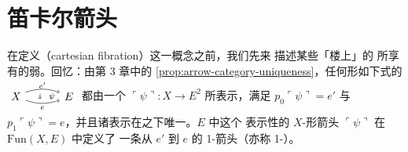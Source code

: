 \providecommand{\qcOne}{\mathbf{1}}   %
\providecommand{\qcTwo}{\mathbf{2}}   %
\providecommand{\qcThree}{\mathbf{3}} %
\providecommand{\qcFour}{\mathbf{4}}  %
\providecommand{\qcor}[1]{\ulcorner#1\urcorner}   %
\providecommand{\cellpair}[5]{$\vcenter{\hbox{\begin{tikzpicture}[x=1.15em,y=1.15em]%
\node (s) at (0,0) {$#1$};%
\node (t) at (4.2,0) {$#2$};%
\draw[->] (0.75,0.32) to[bend left=18] (3.45,0.32);%
\node at (2.1,0.88) {$\scriptstyle#3$};%
\draw[->] (0.75,-0.32) to[bend right=18] (3.45,-0.32);%
\node at (2.1,-0.93) {$\scriptstyle#4$};%
\draw[->] (1.95,0.2) to[bend right=32] (1.95,-0.2);%
\node at (2.85,0) {$\scriptstyle#5$};%
\end{tikzpicture}}}$\ignorespaces}

\section{笛卡尔箭头}\label{sec:cartesian-arrows}

在定义\textbf{\trCartesianFibration}（cartesian fibration）这一概念之前，我们先来
描述某些「楼上」的%
\trNaturalTransformation{}所享有的弱\trUniversalProperty。回忆：由第 3 章中的%
\cref{prop:arrow-category-uniqueness}，任何形如下式的\trNaturalTransformation{}
\cellpair{X}{E}{e'}{e}{\psi}
都由一个\trFunctor{} $\qcor{\psi}\colon X\to E^{2}$ 所表示，满足 $p_{0}\qcor{\psi}=e'$
与 $p_{1}\qcor{\psi}=e$，并且诸表示在\trFiberedIsomorphism{}之下唯一。$E$ 中这个%
表示性的 $X$-形箭头 $\qcor{\psi}$ 在\trFunctorSpace{} $\mathrm{Fun}(X,E)$ 中定义了%
一条从 $e'$ 到 $e$ 的 1-箭头（亦称 1-\trSimplex）。

